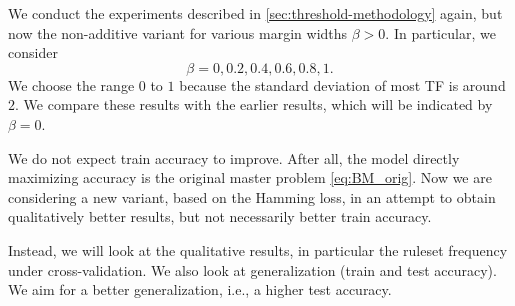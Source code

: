 We conduct the experiments described in \autoref{sec:threshold-methodology} again,
but now the non-additive variant for various margin widths $\beta > 0.$
In particular, we consider \[
                               \beta=0, 0.2, 0.4, 0.6, 0.8, 1.
\]
We choose the range $0$ to $1$ because the standard deviation of most TF is around $2$.
We compare these results with the earlier results, which will be indicated by $\beta=0.$

We do not expect train accuracy to improve.
After all, the model directly maximizing accuracy is the original master problem \eqref{eq:BM_orig}.
Now we are considering a new variant, based on the Hamming loss, in an attempt to obtain qualitatively better results,
but not necessarily better train accuracy.

Instead, we will look at the qualitative results, in particular the ruleset frequency under cross-validation.
We also look at generalization (train and test accuracy).
We aim for a better generalization, i.e., a higher test accuracy.

